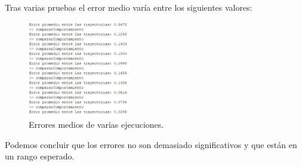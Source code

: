 \documentclass[a4paper, 12pt]{article}
\begin{document}
	Tras varias pruebas el error medio varía entre los siguientes valores:
	\begin{figure}[htp!]
		\centering
		\includegraphics[width=0.4\textwidth]{figures/parte2/ejerI2.png}
		\caption{Errores medios de varias ejecuciones.}
	\end{figure}
	
	Podemos concluir que los errores no son demasiado significativos y que están en un rango esperado.
	
 
\end{document}
